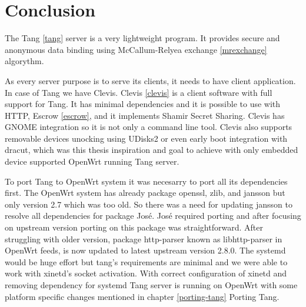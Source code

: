 \chapter{Conclusion}\label{conlusion}



The Tang \ref{tang} server is a very lightweight program.
It provides secure and anonymous data binding using McCallum-Relyea exchange \ref{mrexchange} algorythm.

As every server purpose is to serve its clients, it needs to have client application.
In case of Tang we have Clevis.
Clevis \ref{clevis} is a client software with full support for Tang.
It has minimal dependencies and it is possible to use with HTTP, Escrow \ref{escrow}, and it implements Shamir Secret Sharing.
Clevis has GNOME integration so it is not only a command line tool.
Clevis also supports removable devices unocking using UDisks2 or even early boot integration with dracut, which was this thesis inspiration and goal to achieve with only embedded device supported OpenWrt running Tang server.

To port Tang to OpenWrt system it was necesarry to port all its dependencies first.
The OpenWrt system has already package openssl, zlib, and jansson but only version 2.7 which was too old.
So there was a need for updating jansson to resolve all dependencies for package José.
José required porting and after focusing on upstream version porting on this package was straightforward.
After struggling with older version, package http-parser known as libhttp-parser in OpenWrt feeds, is now updated to latest upstream version 2.8.0.
The systemd would be huge effort but tang's requirements are minimal and we were able to work with xinetd's socket activation.
With correct configuration of xinetd and removing dependency for systemd Tang server is running on OpenWrt with some platform specific changes mentioned in chapter \ref{porting-tang} Porting Tang.
